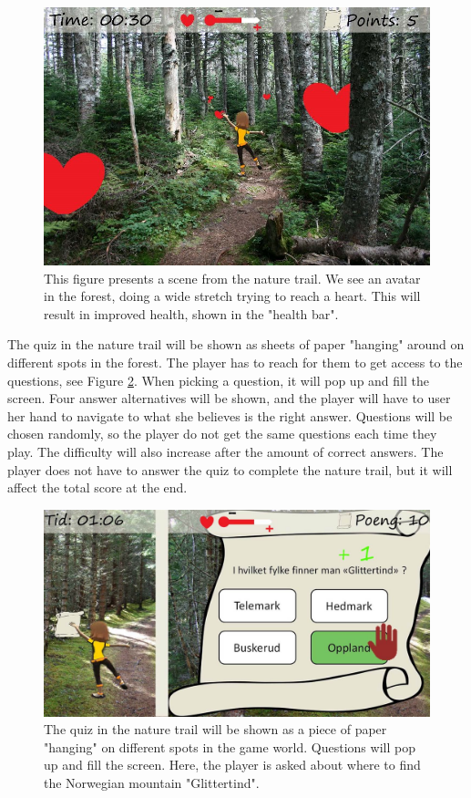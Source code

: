 \begin{figure} [H]
\centering
\includegraphics[scale=0.45]{game1engelsk.jpg}
\caption[Nature trail - stretching]{This figure presents a scene from the nature trail. We see an avatar in the forest, doing a wide stretch trying to reach a heart. This will result in improved health, shown in the "health bar".}
\label{fig:hearts}
\end{figure}

The quiz in the nature trail will be shown as sheets of paper "hanging" around on different spots in the forest. The player has to reach for them to get access to the questions, see Figure \ref{fig:quiz}. When picking a question, it will pop up and fill the screen. Four answer alternatives will be shown, and the player will have to user her hand to navigate to what she believes is the right answer. Questions will be chosen randomly, so the player do not get the same questions each time they play. The difficulty will also increase after the amount of correct answers. The player does not have to answer the quiz to complete the nature trail, but it will affect the total score at the end. 

\begin{figure} [H]
\centering
\includegraphics[scale=0.5]{quiz.jpg}
\caption[Nature trail - quiz]{The quiz in the nature trail will be shown as a piece of paper "hanging" on different spots in the game world. Questions will pop up and fill the screen. Here, the player is asked about where to find the Norwegian mountain "Glittertind".}
\label{fig:quiz}
\end{figure} 

